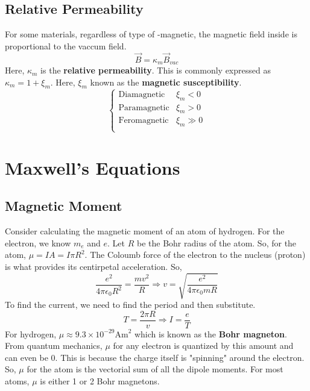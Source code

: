 \documentclass{article}
\begin{document}
\subsection{Relative Permeability}
For some materials, regardless of type of -magnetic, the magnetic field inside is proportional to the vaccum field.
$$\vec{B}=\kappa_{m}\vec{B}_{vac}$$
Here, $\kappa_{m}$ is the \textbf{relative permeability}. This is commonly expressed as $\kappa_{m}=1+\xi_{m}$.
Here, $\xi_{m}$ known as the \textbf{magnetic susceptibility}. 
\[
\begin{cases}
    \text{Diamagnetic} & \xi_{m}<0    \\
    \text{Paramagnetic} & \xi_{m}>0    \\
    \text{Feromagnetic} & \xi_{m}\gg 0 \\
\end{cases}
\]

\section{Maxwell's Equations}
\subsection{Magnetic Moment}
Consider calculating the magnetic moment of an atom of hydrogen. For the electron, we know $m_{e}$ and $e$.
Let $R$ be the Bohr radius of the atom. So, for the atom, $\mu=IA=I\pi R^{2}$. The Coloumb force of the electron 
to the nucleus (proton) is what provides its centirpetal acceleration. So,
$$\frac{e^{2}}{4\pi \epsilon_{0}R^{2}}
=\frac{mv^{2}}{R}\Rightarrow v=\sqrt{\frac{e^{2}}{4\pi \epsilon_{0}mR}}$$
To find the current, we need to find the period and then substitute.
$$T=\frac{2\pi R}{v}\Rightarrow I=\frac{e}{T}$$
For hydrogen, $\mu\approx 9.3\times 10^{-29}\text{Am}^{2}$ which is known as the \textbf{Bohr magneton}.
From quantum mechanics, $\mu$ for any electron is quantized by this amount and can even be $0$. This is because the charge 
itself is "spinning" around the electron. So, $\mu$ for the atom is the vectorial sum of all the dipole moments.
For most atoms, $\mu$ is either 1 or 2 Bohr magnetons.
\end{document}
